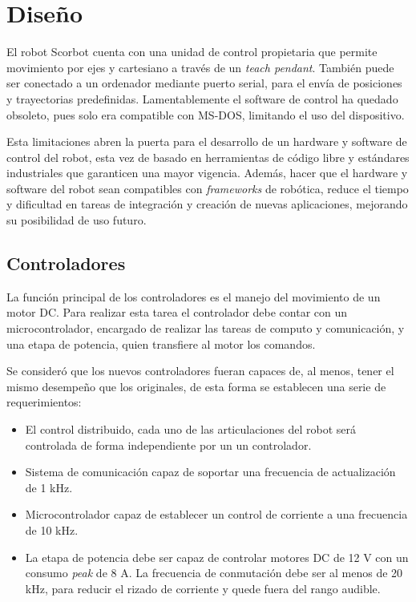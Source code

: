 \chapter{Diseño}

El robot Scorbot cuenta con una unidad de control propietaria que permite movimiento por ejes y cartesiano a través de un \textit{teach pendant}. También puede ser conectado a un ordenador mediante puerto serial, para el envía de posiciones y trayectorias predefinidas. Lamentablemente el software de control ha quedado obsoleto, pues solo era compatible con MS-DOS, limitando el uso del dispositivo.

Esta limitaciones abren la puerta para el desarrollo de un hardware y software de control del robot, esta vez de basado en herramientas de código libre y estándares industriales que garanticen una mayor vigencia. Además, hacer que el hardware y software del robot sean compatibles con \textit{frameworks} de robótica, reduce el tiempo y dificultad en tareas de integración y creación de nuevas aplicaciones, mejorando su posibilidad de uso futuro.

\section{Controladores} \label{cap3_controladores}

La función principal de los controladores es el manejo del movimiento de un motor DC. Para realizar esta tarea el controlador debe contar con un microcontrolador, encargado de realizar las tareas de computo y comunicación, y una etapa de potencia, quien transfiere al motor los comandos.

Se consideró que los nuevos controladores fueran capaces de, al menos, tener el mismo desempeño que los originales, de esta forma se establecen una serie de requerimientos:

\begin{itemize}
\item El control distribuido, cada uno de las articulaciones del robot será controlada de forma independiente por un un controlador.
\item Sistema de comunicación capaz de soportar una frecuencia de actualización de 1 \si{\kilo\hertz}.
\item Microcontrolador capaz de establecer un control de corriente a una frecuencia de 10 \si{\kilo\hertz}.
\item La etapa de potencia debe ser capaz de controlar motores DC de 12 \si{\volt} con un consumo \textit{peak} de 8 \si{\ampere}. La frecuencia de conmutación debe ser al menos de 20 \si{\kilo\hertz}, para reducir el rizado de corriente y quede fuera del rango audible. 
\end{itemize}

